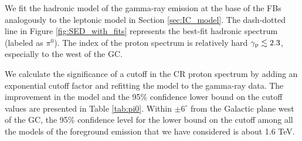 We fit the hadronic model of the gamma-ray emission at the base of the FBs analogously to the leptonic model in 
Section \ref{sec:IC_model}.
The dash-dotted line in Figure \ref{fig:SED_with_fits} represents the best-fit hadronic spectrum (labeled as $\pi^0$). 
The index of the proton spectrum is relatively hard $\gamma_{\text{p}} \lesssim 2.3$, especially to the west of the GC.

We calculate the significance of a cutoff in the CR proton spectrum by adding an exponential cutoff factor and refitting the model to the gamma-ray data.
The improvement in the model and the 95\% confidence lower bound on the cutoff values are presented in Table \ref{tab:pi0}.
Within $\pm 6^\circ$ from the Galactic plane west of the GC, the 95\% confidence level for the lower bound on the cutoff among all the models
of the foreground emission that we have considered is about 1.6 TeV.

